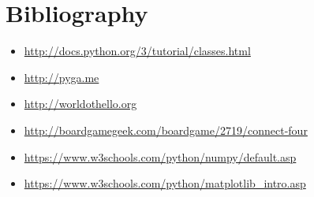 \documentclass[12pt,a4paper]{article}
\begin{document}
\section{Bibliography}
\begin{itemize}
    \item \url{http://docs.python.org/3/tutorial/classes.html}
    \item \url{http://pyga.me}
    \item \url{http://worldothello.org}
    \item \url{http://boardgamegeek.com/boardgame/2719/connect-four}
    \item \url{https://www.w3schools.com/python/numpy/default.asp}
    \item \url{https://www.w3schools.com/python/matplotlib_intro.asp}
\end{itemize}
\end{document}
